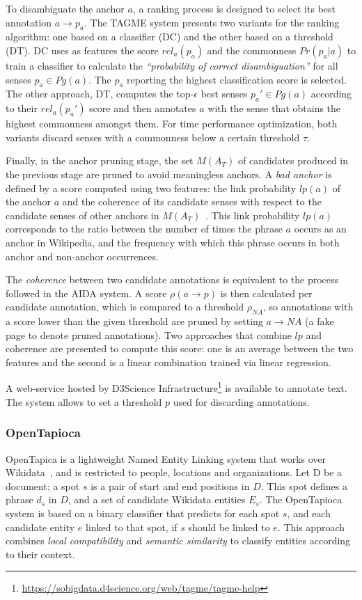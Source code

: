 To disambiguate the anchor $a$, a ranking process is designed to select its best annotation 
$a \rightarrow p_a$. The TAGME system presents two variants for the ranking algorithm: one based 
on a classifier (DC) and the other based on a threshold (DT). DC uses as features the score 
$rel_a(p_a)$ and the commonness $Pr(p_a|a)$ to train a classifier to calculate the 
\textit{“probability of correct disambiguation”} for all senses $p_a \in Pg(a)$. The $p_a$ 
reporting the highest classification score is selected. The other approach, DT, computes the 
top-$\epsilon$ best senses $p_a' \in Pg(a)$ according to their $rel_a(p_a')$ score and then 
annotates $a$ with the sense that obtains the highest commonness amongst them. For time 
performance optimization, both variants discard senses with a commonness below a certain 
threshold $\tau$.

Finally, in the anchor pruning stage, the set $M(A_T)$ of candidates produced in the previous 
stage are pruned to avoid meaningless anchors. A \textit{bad anchor} is defined by a score 
computed using two features: the link probability $lp(a)$ of the anchor $a$ and the coherence of 
its candidate senses with respect to the candidate senses of other anchors in 
$M(A_T)$~\cite{infExtr:MilneW08}. This link probability $lp(a)$ corresponds to the ratio between 
the number of times the phrase $a$ occurs as an anchor in Wikipedia, and the frequency with which 
this phrase occurs in both anchor and non-anchor occurrences.

The \textit{coherence} between two candidate annotations is equivalent to the process followed 
in the AIDA system. A score $\rho(a \rightarrow p)$ is then calculated per candidate annotation, 
which is compared to a threshold $\rho_{NA}$, so annotations with a score lower than the given 
threshold are pruned by setting $a \rightarrow NA$ (a fake page to denote pruned annotations). 
Two approaches that combine $lp$ and coherence are presented to compute this score: one is an 
average between the two features and the second is a linear combination trained via linear 
regression.

A web-service hosted by D3Science Infrastructure\footnote{\url{https://sobigdata.d4science.org/web/tagme/tagme-help}} 
is available to annotate text. The system allows to set a threshold $p$ used for discarding 
annotations.

\subsubsection{OpenTapioca}
\label{cap2:theoFrame/infExtr/entityLinking/openTapioca}
OpenTapica is a lightweight Named Entity Linking system that works over 
Wikidata~\cite{EL:opentapioca-Delpeuch19}, and is restricted to people, locations and 
organizations. Let D be a document; a spot $s$ is a pair of start and end positions in $D$. 
This spot defines a phrase $d_s$ in $D$, and a set of candidate Wikidata entities $E_s$. The 
OpenTapioca system is based on a binary classifier that predicts for each spot $s$, and each 
candidate entity $e$ linked to that spot, if $s$ should be linked to $e$. This approach 
combines \textit{local compatibility} and \textit{semantic similarity} to classify entities 
according to their context.

